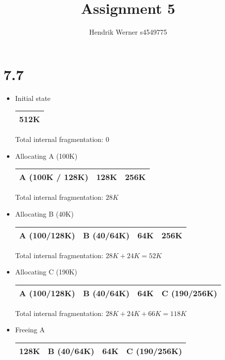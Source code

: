 \documentclass[12pt]{article}
\title{Assignment 5}
\author{Hendrik Werner s4549775}
\begin{document}
\maketitle

\section*{7.7}
	\begin{itemize}
		\item Initial state

		\begin{tabular}{|p{\linewidth}|}
			\hline
			512K\\
			\hline
		\end{tabular}

		Total internal fragmentation: $0$

		\item Allocating A (100K)

		\begin{tabular}{|p{}|p{}|p{}|}
			\hline
			A (100K / 128K) & 128K & 256K\\
			\hline
		\end{tabular}

		Total internal fragmentation: $28K$

		\item Allocating B (40K)

		\begin{tabular}{|p{}|p{}|p{}|p{}|}
			\hline
			A (100/128K) & B (40/64K) & 64K & 256K\\
			\hline
		\end{tabular}

		Total internal fragmentation: $28K + 24K = 52K$

		\item Allocating C (190K)

		\begin{tabular}{|p{}|p{}|p{}|p{}|}
			\hline
			A (100/128K) & B (40/64K) & 64K & C (190/256K)\\
			\hline
		\end{tabular}

		Total internal fragmentation: $28K + 24K + 66K = 118K$

		\item Freeing A

		\begin{tabular}{|p{}|p{}|p{}|p{}|}
			\hline
			128K & B (40/64K) & 64K & C (190/256K)\\
			\hline
		\end{tabular}


\end{itemize}
\end{document}
